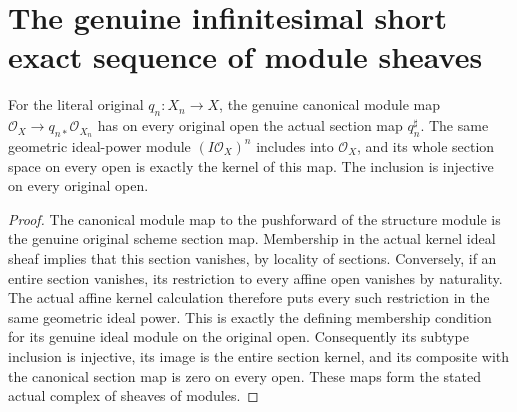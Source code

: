 \section{The genuine infinitesimal short exact sequence of module sheaves}

\begin{lemma}
\label{lem:fibre-infinitesimal-whole-module-kernel}
\leanok
For the literal original $q_n:X_n\to X$, the genuine canonical module
map $\mathcal O_X\to q_{n*}\mathcal O_{X_n}$ has on every original
open the actual section map $q_n^\sharp$. The same geometric ideal-power
module $(I\mathcal O_X)^n$ includes into $\mathcal O_X$, and its whole
section space on every open is exactly the kernel of this map. The
inclusion is injective on every original open.
\end{lemma}
\begin{proof}
The canonical module map to the pushforward of the structure module is
the genuine original scheme section map. Membership in the actual
kernel ideal sheaf implies that this section vanishes, by locality of
sections. Conversely, if an entire section vanishes, its restriction to
every affine open vanishes by naturality. The actual affine kernel
calculation therefore puts every such restriction in the same
geometric ideal power. This is exactly the defining membership condition
for its genuine ideal module on the original open. Consequently its
subtype inclusion is injective, its image is the entire section kernel,
and its composite with the canonical section map is zero on every
open. These maps form the stated actual complex of sheaves of modules.
\end{proof}

